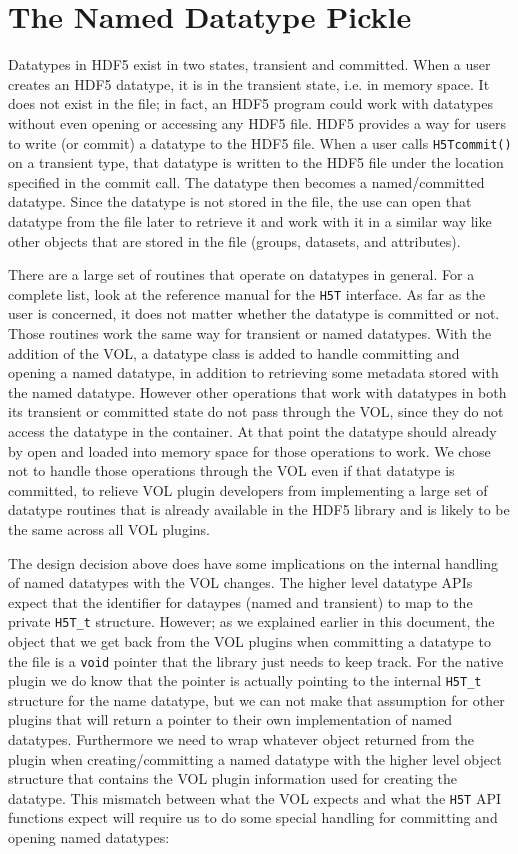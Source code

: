 \section{The Named Datatype Pickle}
Datatypes in HDF5 exist in two states, transient and committed. When a user creates an HDF5 datatype, it is in the transient state, i.e. in memory space. It does not exist in the file; in fact, an HDF5 program could work with datatypes without even opening or accessing any HDF5 file. HDF5 provides a way for users to write (or commit) a datatype to the HDF5 file. When a user calls {\tt H5Tcommit()} on a transient type, that datatype is written to the HDF5 file under the location specified in the commit call. The datatype then becomes a named/committed datatype. Since the datatype is not stored in the file, the use can open that datatype from the file later to retrieve it and work with it in a similar way like other objects that are stored in the file (groups, datasets, and attributes).

There are a large set of routines that operate on datatypes in general. For a complete list, look at the reference manual for the {\tt H5T} interface. As far as the user is concerned, it does not matter whether the datatype is committed or not. Those routines work the same way for transient or named datatypes. With the addition of the VOL, a datatype class is added to handle committing and opening a named datatype, in addition to retrieving some metadata stored with the named datatype. However other operations that work with datatypes in both its transient or committed state do not pass through the VOL, since they do not access the datatype in the container. At that point the datatype should already by open and loaded into memory space for those operations to work. We chose not to handle those operations through the VOL even if that datatype is committed, to relieve VOL plugin developers from implementing a large set of datatype routines that is already available in the HDF5 library and is likely to be the same across all VOL plugins.

The design decision above does have some implications on the internal handling of named datatypes with the VOL changes. The higher level datatype APIs expect that the identifier for dataypes (named and transient) to map to the private {\tt H5T\_t} structure. However; as we explained earlier in this document, the object that we get back from the VOL plugins when committing a datatype to the file is a {\tt void} pointer that the library just needs to keep track. For the native plugin we do know that the pointer is actually pointing to the internal {\tt H5T\_t} structure for the name datatype, but we can not make that assumption for other plugins that will return a pointer to their own implementation of named datatypes. Furthermore we need to wrap whatever object returned from the plugin when creating/committing a named datatype with the higher level object structure that contains the VOL plugin information used for creating the datatype. This mismatch between what the VOL expects and what the {\tt H5T} API functions expect will require us to do some special handling for committing and opening named datatypes:


